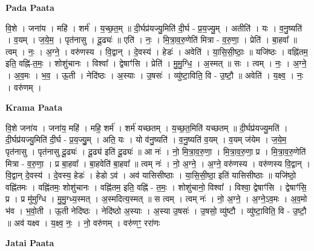 \documentclass[17pt]{extarticle}
\begin{document}
\textbf{Pada Paata} \newline

वि॒शे । जना॑य । महि॑ । शर्म॑ । य॒च्छ॒त॒म् ॥ दी॒र्घप्र॑यज्यु॒मिति॑ दी॒र्घ - प्र॒य॒ज्यु॒म् । अतीति॑ । यः । व॒नु॒ष्यति॑ । व॒यम् । ज॒ये॒म॒ । पृत॑नासु । दू॒ढ्यः॑ ॥ एति॑ । नः॒ । मि॒त्रा॒व॒रु॒णेति॑ मित्रा - व॒रु॒णा॒ । प्रेति॑ । बा॒हवा᳚ ॥ त्वम् । नः॒ । अ॒ग्ने॒ । वरु॑णस्य । वि॒द्वान् । दे॒वस्य॑ । हेडः॑ । अवेति॑ । या॒सि॒सी॒ष्ठाः॒ ॥ यजि॑ष्ठः । वह्नि॑तम॒ इति॒ वह्नि॑-त॒मः॒ । शोशु॑चानः । विश्वा᳚ । द्वेषाꣳ॑सि । प्रेति॑ । मु॒मु॒ग्धि॒ । अ॒स्मत् ॥ सः । त्वम् । नः॒ । अ॒ग्ने॒ । अ॒व॒मः । भ॒व॒ । ऊ॒ती । नेदि॑ष्ठः । अ॒स्याः । उ॒षसः॑ । व्यु॑ष्टा॒विति॒ वि - उ॒ष्टौ॒ ॥ अवेति॑ । य॒क्ष्व॒ । नः॒ । वरु॑णम् ।  \newline


\textbf{Krama Paata} \newline

वि॒शे जना॑य । जना॑य॒ महि॑ । महि॒ शर्म॑ । शर्म॑ यच्छतम् । य॒च्छ॒त॒मिति॑ यच्छतम् ॥ दी॒र्घप्र॑यज्यु॒मति॑ । दी॒र्घप्र॑यज्यु॒मिति॑ दी॒र्घ - प्र॒य॒ज्यु॒॒म् । अति॒ यः । यो व॑नु॒ष्यति॑ । व॒नु॒ष्यति॑ व॒यम् । व॒यम् ज॑येम । ज॒ये॒म॒ पृत॑नासु । पृत॑नासु दू॒ढ्यः॑ । दू॒ढ्य॑ इति॑ दू॒ढ्यः॑ ॥ आ नः॑ । नो॒ मि॒त्रा॒व॒रु॒णा॒ । मि॒त्रा॒व॒रु॒णा॒ प्र । मि॒त्रा॒व॒रु॒णेति॑ मित्रा - व॒रु॒णा॒ । प्र बा॒हवा᳚ । बा॒हवेति॑ बा॒हवा᳚ ॥ त्वम् नः॑ । नो॒ अ॒ग्ने॒ । अ॒ग्ने॒ वरु॑णस्य । वरु॑णस्य वि॒द्वान् । वि॒द्वान् दे॒वस्य॑ । दे॒वस्य॒ हेडः॑ । हेडो ऽव॑ । अव॑ यासिसीष्ठाः । या॒सि॒सी॒ष्ठा॒ इति॑ यासिसीष्ठाः ॥ यजि॑ष्ठो॒ वह्नि॑तमः । वह्नि॑तमः॒ शोशु॑चानः । वह्नि॑तम॒ इति॒ वह्नि॑ - त॒मः॒ । शोशु॑चानो॒ विश्वा᳚ । विश्वा॒ द्वेषाꣳ॑सि । द्वेषाꣳ॑सि॒ प्र । प्र मु॑मुग्धि । मु॒मु॒ग्ध्य॒स्मत् । अ॒स्मदित्य॒स्मत् ॥ स त्वम् । त्वम् नः॑ । नो॒ अ॒ग्ने॒ । अ॒ग्ने॒ऽव॒मः । अ॒व॒मो भ॑व । भ॒वो॒ती । ऊ॒ती नेदि॑ष्ठः । नेदि॑ष्ठो अ॒स्याः । अ॒स्या उ॒षसः॑ । उ॒षसो॒ व्यु॑ष्टौ । व्यु॑ष्टा॒विति॒ वि - उ॒ष्टौ॒ ॥ अव॑ यक्ष्व । य॒क्ष्व॒ नः॒ । नो॒ वरु॑णम् । वरु॑णꣳ॒॒ ररा॑णः \newline

\textbf{Jatai Paata} \newline
\end{document}
